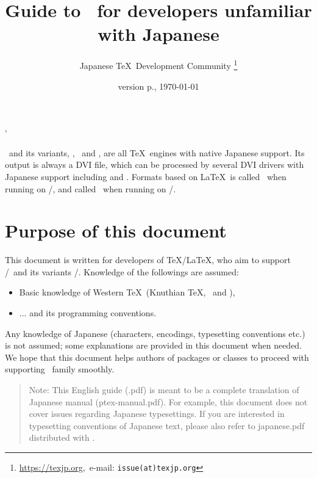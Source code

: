 \documentclass[a4paper,11pt,dvipdfmx]{article}
\let\emph=\origemph
\def\file#1{\textsf{#1}}
\begin{document}
\catcode`
\title{\textsf{\textbf{Guide to \pTeX\ for developers unfamiliar with Japanese}}}
\author{Japanese \TeX\ Development Community\null
\thanks{\url{https://texjp.org},\ e-mail: \texttt{issue(at)texjp.org}}}
\date{version p\the\ptexversion.\the\ptexminorversion\ptexrevision, \today}
\maketitle

\pTeX\ and its variants, \upTeX, \epTeX\ and \eupTeX, are all \TeX\ engines
with native Japanese support.
Its output is always a DVI file, which can be processed by several
DVI drivers with Japanese support including \emph{dvips} and \emph{dvipdfmx}.
Formats based on \LaTeX\ is called \pLaTeX\ when running on \pTeX/\epTeX,
and called \upLaTeX\ when running on \upTeX/\eupTeX.

\section*{Purpose of this document}

This document is written for developers of \TeX/\LaTeX, who aim to
support \pTeX/\pLaTeX\ and its variants \upTeX/\upLaTeX.
Knowledge of the followings are assumed:
\begin{itemize}
  \item Basic knowledge of Western \TeX\ (Knuthian \TeX, \eTeX\ and \pdfTeX),
  \item ... and its programming conventions.
\end{itemize}

Any knowledge of Japanese (characters, encodings, typesetting conventions etc.)
is not assumed; some explanations are provided in this document when needed.
We hope that this document helps authors of packages or classes
to proceed with supporting \pTeX\ family smoothly.

\begin{quotation}
Note: This English guide (\file{\jobname.pdf}) is \emph{not} meant
to be a complete translation of Japanese manual (\file{ptex-manual.pdf}).
For example, this document does not cover issues regarding Japanese typesettings.
If you are interested in typesetting conventions of Japanese text, please also
refer to \file{japanese.pdf} distributed with .
\end{quotation}
\end{document}
